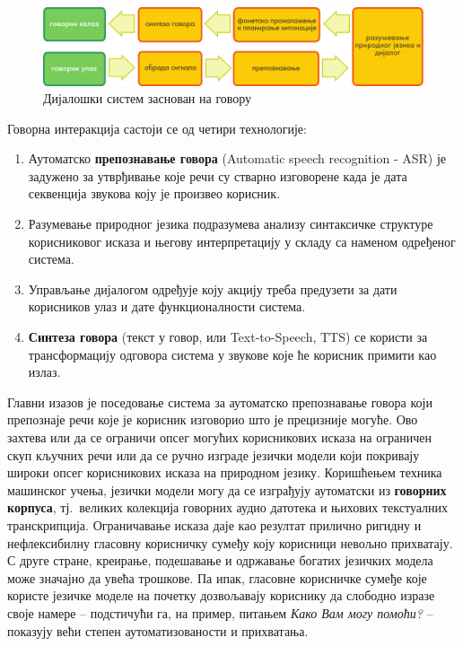 \begin{multicols}{2}
\begin{figure}[htb]
  \center 
  \includegraphics[width=\textwidth]{../_media/serbian/simple_speech-based_dialogue_architecture}
  \caption{Дијалошки систем заснован на говору}
  \label{fig:dialoguearch_sr}
\end{figure}   


Говорна интеракција састоји се од четири технологије: 
\begin{enumerate}
\item Аутоматско \textbf{препознавање говора} (Automatic speech recognition  - ASR) је задужено за утврђивање које речи су стварно изговорене када је дата секвенција звукова коју је произвео корисник. 
\item Разумевање природног језика подразумева  анализу синтаксичке структуре корисниковог исказа и његову интерпретацију у складу са наменом одређеног система.
\item Управљање дијалогом одређује коју акцију треба предузети за дати корисников улаз и дате функционалности система. 
\item \textbf{Синтеза говора} (текст у говор, или Text-to-Speech, TTS) се користи за трансформацију одговора система у звукове које ће корисник примити као излаз. 
\end{enumerate}
Главни изазов је поседовање система за аутоматско препознавање говора који препознаје речи које је корисник изговорио што је прецизније могуће. Ово захтева или да се ограничи опсег могућих корисникових исказа на ограничен скуп кључних речи или да се ручно изграде језички модели који покривају широки опсег корисникових исказа на природном језику. Коришћењем техника машинског учења, језички модели могу да се изграђују аутоматски из \textbf{говорних корпуса}, тј.~великих колекција говорних аудио датотека и њихових текстуалних транскрипција. Ограничавање исказа даје као резултат прилично ригидну и нефлексибилну  гласовну корисничку сумеђу коју корисници невољно прихватају. С друге стране, креирање, подешавање и одржавање богатих језичких модела може значајно да увећа трошкове. Па ипак, гласовне корисничке сумеђе  које користе језичке моделе на почетку дозвољавају кориснику да слободно изразе своје намере -- подстичући га, на пример, питањем \textit{Како Вам могу помоћи?} -- показују већи степен аутоматизованости и прихватања. 


\end{multicols}
